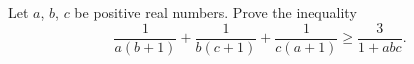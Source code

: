 Let $ a$,  $ b$,  $ c$ be positive real numbers. Prove the inequality\[ \frac{1}{a\left(b+1\right)}+\frac{1}{b\left(c+1\right)}+\frac{1}{c\left(a+1\right)}\geq \frac{3}{1+abc}. \]